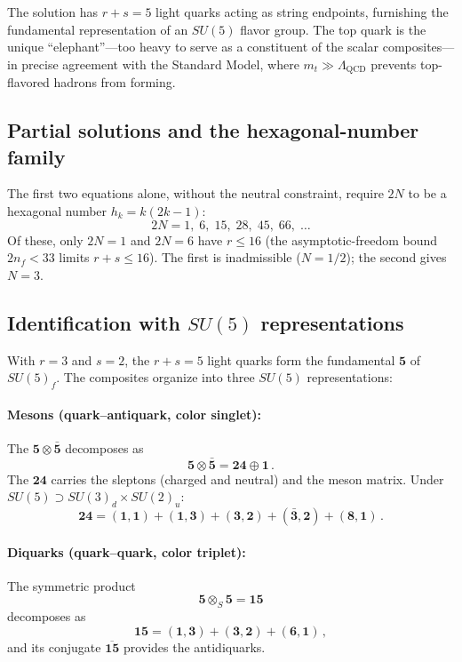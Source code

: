 \documentclass[12pt,a4paper]{article}
\begin{document}
\medskip
The solution has $r + s = 5$ light quarks acting as string endpoints,
furnishing the fundamental representation of an $SU(5)$ flavor group.
The top quark is the unique ``elephant''---too heavy to serve as a
constituent of the scalar composites---in precise agreement with the
Standard Model, where $m_t \gg \Lambda_{\text{QCD}}$ prevents
top-flavored hadrons from forming.

\subsection{Partial solutions and the hexagonal-number family}
The first two equations alone, without the
neutral constraint, require $2N$ to be a hexagonal number
$h_k = k(2k-1)$:
\[
2N = 1,\; 6,\; 15,\; 28,\; 45,\; 66,\; \ldots
\]
Of these, only $2N = 1$ and $2N = 6$ have $r \leq 16$ (the
asymptotic-freedom bound $2n_f < 33$ limits $r + s \leq 16$).
The first is inadmissible ($N = 1/2$); the second gives $N = 3$.

\subsection{Identification with $SU(5)$ representations}
With $r = 3$ and $s = 2$, the $r + s = 5$ light quarks form the
fundamental $\mathbf{5}$ of $SU(5)_f$.  The composites organize
into three $SU(5)$ representations:

\paragraph{Mesons (quark--antiquark, color singlet):}
The $\mathbf{5} \otimes \bar{\mathbf{5}}$ decomposes as
\begin{equation}
\mathbf{5} \otimes \bar{\mathbf{5}}
= \mathbf{24} \oplus \mathbf{1}\,.
\end{equation}
The $\mathbf{24}$ carries the sleptons (charged and neutral) and
the meson matrix.  Under
$SU(5) \supset SU(3)_d \times SU(2)_u$:
\begin{equation}
\mathbf{24} = (\mathbf{1},\mathbf{1})
+ (\mathbf{1},\mathbf{3})
+ (\mathbf{3},\mathbf{2})
+ (\bar{\mathbf{3}},\mathbf{2})
+ (\mathbf{8},\mathbf{1})\,.
\end{equation}

\paragraph{Diquarks (quark--quark, color triplet):}
The symmetric product
\begin{equation}
\mathbf{5} \otimes_S \mathbf{5}
= \mathbf{15}
\end{equation}
decomposes as
\begin{equation}
\mathbf{15} = (\mathbf{1},\mathbf{3})
+ (\mathbf{3},\mathbf{2})
+ (\mathbf{6},\mathbf{1})\,,
\end{equation}
and its conjugate $\overline{\mathbf{15}}$ provides the
antidiquarks.
\end{document}

